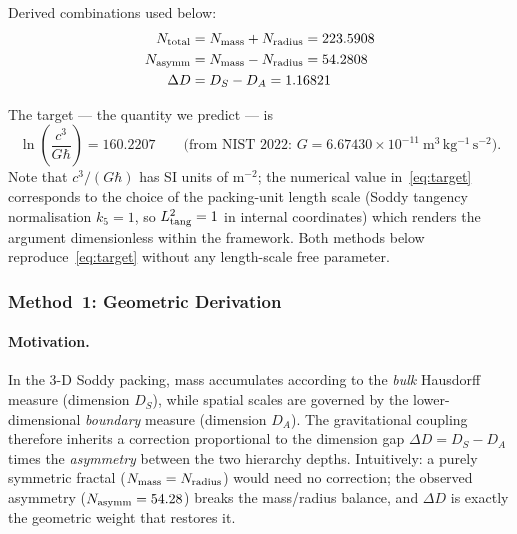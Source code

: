\documentclass[11pt,a4paper]{article}
\begin{document}
        Derived combinations used below:
        \begin{align*}
          N_{\rm total} &= N_{\rm mass} + N_{\rm radius} = 223.5908 \\
          N_{\rm asymm} &= N_{\rm mass} - N_{\rm radius} = 54.2808 \\
          \Delta D       &= D_S - D_A = 1.16821
        \end{align*}

        The target — the quantity we predict — is
        \begin{equation}
          \ln\!\left(\frac{c^3}{G\hbar}\right) = 160.2207
          \qquad\text{(from NIST 2022:\ } G = 6.67430\times10^{-11}
          \ \mathrm{m^3\,kg^{-1}\,s^{-2}}\text{)}.
          \label{eq:target}
        \end{equation}
        Note that $c^3/(G\hbar)$ has SI units of m$^{-2}$; the numerical
        value in~\eqref{eq:target} corresponds to the choice of the
        packing-unit length scale (Soddy tangency normalisation
        $k_5 = 1$, so $L_{\rm tang}^2 = 1$ in internal coordinates)
        which renders the argument dimensionless within the framework.
        Both methods below reproduce~\eqref{eq:target} without any
        length-scale free parameter.

      \subsubsection{Method~1: Geometric Derivation}

        \paragraph{Motivation.}

        In the 3-D Soddy packing, mass accumulates according to the
        \emph{bulk} Hausdorff measure (dimension $D_S$), while spatial
        scales are governed by the lower-dimensional \emph{boundary}
        measure (dimension $D_A$).  The gravitational coupling
        therefore inherits a correction proportional to the dimension
        gap $\Delta D = D_S - D_A$ times the \emph{asymmetry} between
        the two hierarchy depths.  Intuitively: a purely symmetric
        fractal ($N_{\rm mass} = N_{\rm radius}$) would need no
        correction; the observed asymmetry ($N_{\rm asymm} = 54.28$)
        breaks the mass/radius balance, and $\Delta D$ is exactly the
        geometric weight that restores it.
\end{document}
